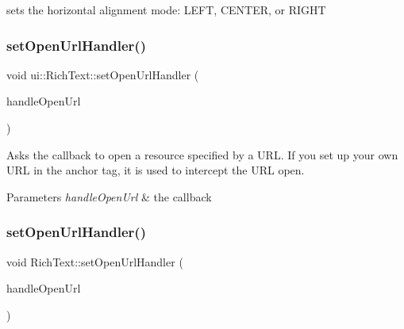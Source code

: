sets the horizontal alignment mode\+: L\+E\+FT, C\+E\+N\+T\+ER, or R\+I\+G\+HT \mbox{\label{classui_1_1RichText_afd77b67b1697a3e837a31fb88df0795e}} 
\subsubsection{\texorpdfstring{set\+Open\+Url\+Handler()}{setOpenUrlHandler()}\hspace{0.1cm}{\footnotesize\ttfamily [1/2]}}
{\footnotesize\ttfamily void ui\+::\+Rich\+Text\+::set\+Open\+Url\+Handler (\begin{DoxyParamCaption}\item[{const \hyperlink{classui_1_1RichText_ad3631ae61d204f1d9576f5923bbd762e}{Open\+Url\+Handler} \&}]{handle\+Open\+Url }\end{DoxyParamCaption})}



Asks the callback to open a resource specified by a U\+RL.  If you set up your own U\+RL in the anchor tag, it is used to intercept the U\+RL open. 


\begin{DoxyParams}{Parameters}
{\em handle\+Open\+Url} & the callback \\
\hline
\end{DoxyParams}
\mbox{\label{classui_1_1RichText_a750e15147a256bf092a8670720548f38}} 
\subsubsection{\texorpdfstring{set\+Open\+Url\+Handler()}{setOpenUrlHandler()}\hspace{0.1cm}{\footnotesize\ttfamily [2/2]}}
{\footnotesize\ttfamily void Rich\+Text\+::set\+Open\+Url\+Handler (\begin{DoxyParamCaption}\item[{const \hyperlink{classui_1_1RichText_ad3631ae61d204f1d9576f5923bbd762e}{Open\+Url\+Handler} \&}]{handle\+Open\+Url }\end{DoxyParamCaption})}



